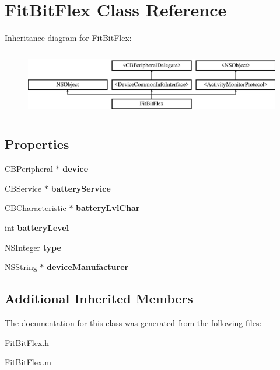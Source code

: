 \hypertarget{interface_fit_bit_flex}{\section{Fit\-Bit\-Flex Class Reference}
\label{interface_fit_bit_flex}
}
Inheritance diagram for Fit\-Bit\-Flex\-:\begin{figure}[H]
\begin{center}
\leavevmode
\includegraphics[height=2.901554cm]{interface_fit_bit_flex}
\end{center}
\end{figure}
\subsection*{Properties}
\begin{DoxyCompactItemize}
\item 
\hypertarget{interface_fit_bit_flex_ac539ad853d5729137679c3293cba75f5}{C\-B\-Peripheral $\ast$ {\bfseries device}}\label{interface_fit_bit_flex_ac539ad853d5729137679c3293cba75f5}

\item 
\hypertarget{interface_fit_bit_flex_af23b05b17587b9810d93909f279cca75}{C\-B\-Service $\ast$ {\bfseries battery\-Service}}\label{interface_fit_bit_flex_af23b05b17587b9810d93909f279cca75}

\item 
\hypertarget{interface_fit_bit_flex_a0d5ca990dbff1852b3d8a07faa91234b}{C\-B\-Characteristic $\ast$ {\bfseries battery\-Lvl\-Char}}\label{interface_fit_bit_flex_a0d5ca990dbff1852b3d8a07faa91234b}

\item 
\hypertarget{interface_fit_bit_flex_a6141ecb075c9553d179dc5210d2c4952}{int {\bfseries battery\-Level}}\label{interface_fit_bit_flex_a6141ecb075c9553d179dc5210d2c4952}

\item 
\hypertarget{interface_fit_bit_flex_a77895e42698dfb9e32ea3511dd68aa3e}{N\-S\-Integer {\bfseries type}}\label{interface_fit_bit_flex_a77895e42698dfb9e32ea3511dd68aa3e}

\item 
\hypertarget{interface_fit_bit_flex_a3b4fca544836750998946aab4d4c8a3d}{N\-S\-String $\ast$ {\bfseries device\-Manufacturer}}\label{interface_fit_bit_flex_a3b4fca544836750998946aab4d4c8a3d}

\end{DoxyCompactItemize}
\subsection*{Additional Inherited Members}


The documentation for this class was generated from the following files\-:\begin{DoxyCompactItemize}
\item 
Fit\-Bit\-Flex.\-h\item 
Fit\-Bit\-Flex.\-m\end{DoxyCompactItemize}
